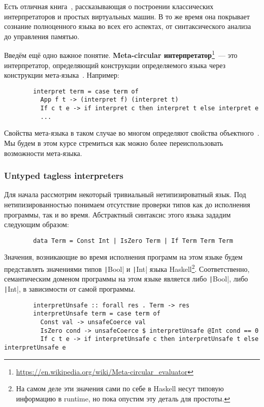 \documentclass[12pt]{article}
\newcommand{\vocab}[1]{\textbf{#1}} %
\begin{document}
    Есть отличная книга~\cite{nystrom2021crafting}, рассказывающая о построении классических интерпретаторов и простых виртуальных машин.
    В то же время она покрывает сознание полноценного языка во всех его аспектах, от синтаксического анализа до управления памятью.

    Введём ещё одно важное понятие.
    \vocab{Meta-circular интерпретатор}\footnote{\url{https://en.wikipedia.org/wiki/Meta-circular_evaluator}}~--- это интерпретатор, определяющий конструкции определяемого языка через конструкции мета-языка~\cite{reynolds1972definitional}.
    Например:
    \begin{verbatim}
        interpret term = case term of
          App f t -> (interpret f) (interpret t)
          If c t e -> if interpret c then interpret t else interpret e
          ...
    \end{verbatim}

    Свойства мета-языка в таком случае во многом определяют свойства объектного~\cite{reynolds1972definitional,reynolds1998definitional}.
    Мы будем в этом курсе стремиться как можно более переиспользовать возможности мета-языка.

    \subsubsection{Untyped tagless interpreters}

    Для начала рассмотрим некоторый тривиальный нетипизироватный язык.
    Под нетипизированностью понимаем отсутствие проверки типов как до исполнения программы, так и во время.
    Абстрактный синтаксис этого языка зададим следующим образом:
    \begin{verbatim}
        data Term = Const Int | IsZero Term | If Term Term Term
    \end{verbatim}

    Значения, возникающие во время исполнения программ на этом языке будем представлять значениями типов \texttt|Bool| и \texttt|Int| языка Haskell\footnote{На самом деле эти значения сами по себе в Haskell несут типовую информацию в runtime, но пока опустим эту деталь для простоты.}.
    Соответственно, семантическим доменом программы на этом языке является либо \texttt|Bool|, либо \texttt|Int|, в зависимости от самой программы.
    \begin{verbatim}
        interpretUnsafe :: forall res . Term -> res
        interpretUnsafe term = case term of
          Const val -> unsafeCoerce val
          IsZero cond -> unsafeCoerce $ interpretUnsafe @Int cond == 0
          If c t e -> if interpretUnsafe c then interpretUnsafe t else interpretUnsafe e
    \end{verbatim}
\end{document}
